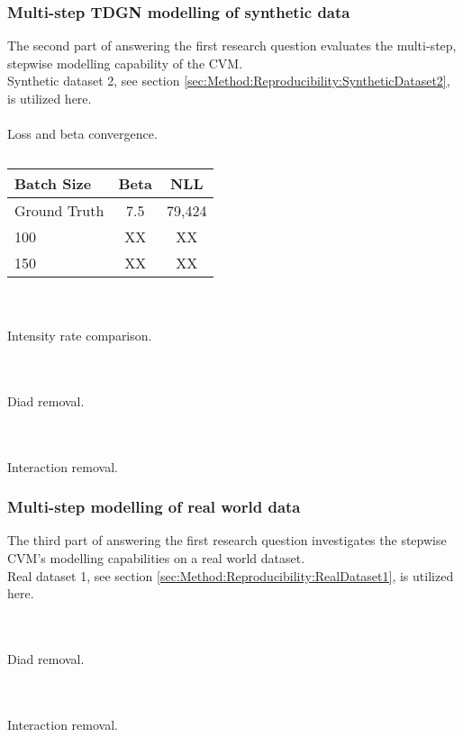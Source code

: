 \subsubsection{Multi-step TDGN modelling of synthetic data}
\label{sec:ResearchQuestion1:multiStepSynthetic}
The second part of answering the first research question evaluates the multi-step, stepwise modelling capability of the CVM.
\\
Synthetic dataset 2, see section \ref{sec:Method:Reproducibility:SyntheticDataset2}, is utilized here.
\\\\
Loss and beta convergence.

\begin{table}[h!]
\centering
\begin{tabular}{|l|cc|}
\hline
Batch Size   & Beta & NLL\\ \hline
Ground Truth & 7.5  & 79,424      \\
100          & XX   & XX       \\
150          & XX   & XX       \\
\hline
\end{tabular}
\caption{}
\label{tab:SingleStep1}
\end{table}


\\\\
Intensity rate comparison.


\\\\
Diad removal.


\\\\
Interaction removal.



\subsubsection{Multi-step modelling of real world data}
\label{sec:ResearchQuestion1:dataset2}
The third part of answering the first research question investigates the stepwise CVM's modelling capabilities on a real world dataset.
\\
Real dataset 1, see section \ref{sec:Method:Reproducibility:RealDataset1}, is utilized here.



\\\\
Diad removal.


\\\\
Interaction removal.



